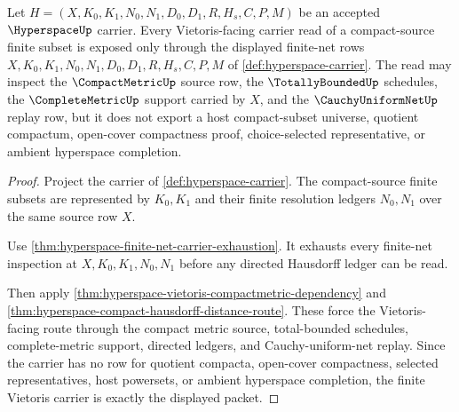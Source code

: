 \begin{theorem}
\label{thm:hyperspace-finite-vietoris-carrier}
Let $H=(X,K_0,K_1,N_0,N_1,D_0,D_1,R,H_s,C,P,M)$ be an accepted $\HyperspaceUp$ carrier. Every Vietoris-facing carrier read of a compact-source finite subset is exposed only through the displayed finite-net rows $X,K_0,K_1,N_0,N_1,D_0,D_1,R,H_s,C,P,M$ of \autoref{def:hyperspace-carrier}. The read may inspect the $\CompactMetricUp$ source row, the $\TotallyBoundedUp$ schedules, the $\CompleteMetricUp$ support carried by $X$, and the $\CauchyUniformNetUp$ replay row, but it does not export a host compact-subset universe, quotient compactum, open-cover compactness proof, choice-selected representative, or ambient hyperspace completion.
\end{theorem}
\begin{proof}
Project the carrier of \autoref{def:hyperspace-carrier}. The compact-source finite subsets are represented by $K_0,K_1$ and their finite resolution ledgers $N_0,N_1$ over the same source row $X$.

Use \autoref{thm:hyperspace-finite-net-carrier-exhaustion}. It exhausts every finite-net inspection at $X,K_0,K_1,N_0,N_1$ before any directed Hausdorff ledger can be read.

Then apply \autoref{thm:hyperspace-vietoris-compactmetric-dependency} and \autoref{thm:hyperspace-compact-hausdorff-distance-route}. These force the Vietoris-facing route through the compact metric source, total-bounded schedules, complete-metric support, directed ledgers, and Cauchy-uniform-net replay. Since the carrier has no row for quotient compacta, open-cover compactness, selected representatives, host powersets, or ambient hyperspace completion, the finite Vietoris carrier is exactly the displayed packet.
\end{proof}

